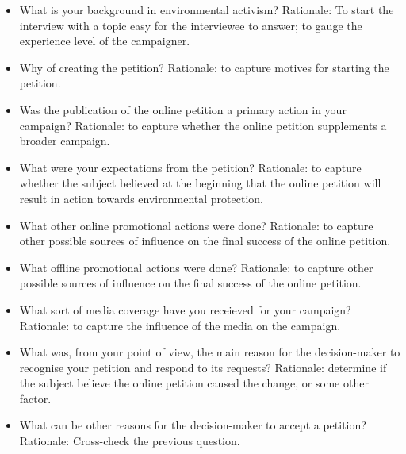 \begin{itemize}
    \item What is your background in environmental activism? Rationale: To start the interview with a topic easy for the interviewee to answer; to gauge the experience level of the campaigner.
    \item Why of creating the petition? Rationale: to capture motives for starting the petition.
    \item Was the publication of the online petition a primary action in your campaign? Rationale: to capture whether the online petition supplements a broader campaign.
    \item What were your expectations from the petition? Rationale: to capture whether the subject believed at the beginning that the online petition will result in action towards environmental protection.
    \item What other online promotional actions were done? Rationale: to capture other possible sources of influence on the final success of the online petition.
    \item What offline promotional actions were done? Rationale: to capture other possible sources of influence on the final success of the online petition.
    \item What sort of media coverage have you receieved for your campaign? Rationale: to capture the influence of the media on the campaign.
    \item What was, from your point of view, the main reason for the decision-maker to recognise your petition and respond to its requests? Rationale: determine if the subject believe the online petition caused the change, or some other factor.
    \item What can be other reasons for the decision-maker to accept a petition? Rationale: Cross-check the previous question.
\end{itemize}

